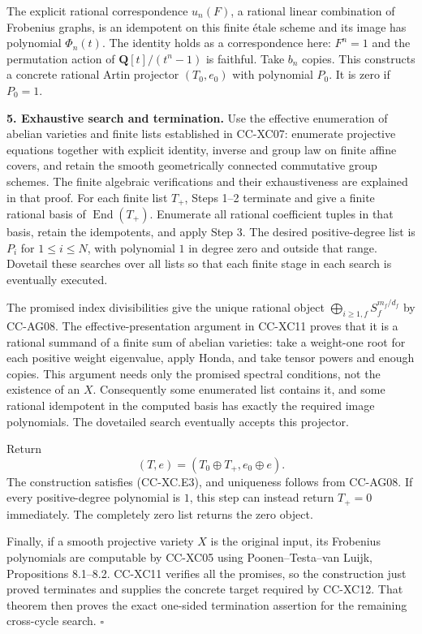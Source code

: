 The explicit rational correspondence \(u_n(F)\), a rational linear
combination of Frobenius graphs, is an idempotent on this finite étale
scheme and its image has polynomial \(\Phi_n(t)\). The identity holds as
a correspondence here: \(F^n=1\) and the permutation action of
\(\mathbf Q[t]/(t^n-1)\) is faithful. Take \(b_n\) copies. This
constructs a concrete rational Artin projector \((T_0,e_0)\) with
polynomial \(P_0\). It is zero if \(P_0=1\).

\textbf{5. Exhaustive search and termination.} Use the effective
enumeration of abelian varieties and finite lists established in
CC-XC07: enumerate projective equations together with explicit identity,
inverse and group law on finite affine covers, and retain the smooth
geometrically connected commutative group schemes. The finite algebraic
verifications and their exhaustiveness are explained in that proof. For
each finite list \(T_+\), Steps 1--2 terminate and give a finite
rational basis of \(\operatorname{End}(T_+)\). Enumerate all rational
coefficient tuples in that basis, retain the idempotents, and apply Step
3. The desired positive-degree list is \(P_i\) for \(1\le i\le N\), with
polynomial \(1\) in degree zero and outside that range. Dovetail these
searches over all lists so that each finite stage in each search is
eventually executed.

The promised index divisibilities give the unique rational object
\(\bigoplus_{i\ge1,f}S_f^{m_f/d_f}\) by CC-AG08. The
effective-presentation argument in CC-XC11 proves that it is a rational
summand of a finite sum of abelian varieties: take a weight-one root for
each positive weight eigenvalue, apply Honda, and take tensor powers and
enough copies. This argument needs only the promised spectral
conditions, not the existence of an \(X\). Consequently some enumerated
list contains it, and some rational idempotent in the computed basis has
exactly the required image polynomials. The dovetailed search eventually
accepts this projector.

Return \[
                     (T,e)=(T_0\oplus T_+,e_0\oplus e).
                                                        \tag{CC-XC.E10}
\] The construction satisfies (CC-XC.E3), and uniqueness follows from
CC-AG08. If every positive-degree polynomial is \(1\), this step can
instead return \(T_+=0\) immediately. The completely zero list returns
the zero object.

Finally, if a smooth projective variety \(X\) is the original input, its
Frobenius polynomials are computable by CC-XC05 using Poonen--Testa--van
Luijk, Propositions 8.1--8.2. CC-XC11 verifies all the promises, so the
construction just proved terminates and supplies the concrete target
required by CC-XC12. That theorem then proves the exact one-sided
termination assertion for the remaining cross-cycle search. \(\square\)

